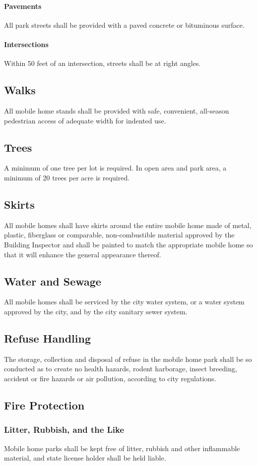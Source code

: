 \paragraph{Pavements}
All park streets shall be provided with a paved concrete or bituminous surface.
\paragraph{Intersections}
Within 50 feet of an intersection, streets shall be at right angles.
\subsection{Walks}
All mobile home stands shall be provided with safe, convenient, all-season pedestrian access of adequate width for indented use.
\subsection{Trees}
A minimum of one tree per lot is required. In open area and park area, a minimum of 20 trees per acre is required.
\subsection{Skirts}
All mobile homes shall have skirts around the entire mobile home made of metal, plastic, fiberglass or comparable, non-combustible material approved by the Building Inspector and shall be painted to match the appropriate mobile home so that it will enhance the general appearance thereof.
\subsection{Water and Sewage}
All mobile homes shall be serviced by the city water system, or a water system approved by the city, and by the city sanitary sewer system.
\subsection{Refuse Handling}
The storage, collection and disposal of refuse in the mobile home park shall be so conducted as to create no health hazards, rodent harborage, insect breeding, accident or fire hazards or air pollution, according to city regulations.
\subsection{Fire Protection}
\subsubsection{Litter, Rubbish, and the Like}
Mobile home parks shall be kept free of litter, rubbish and other inflammable material, and state license holder shall be held liable.
